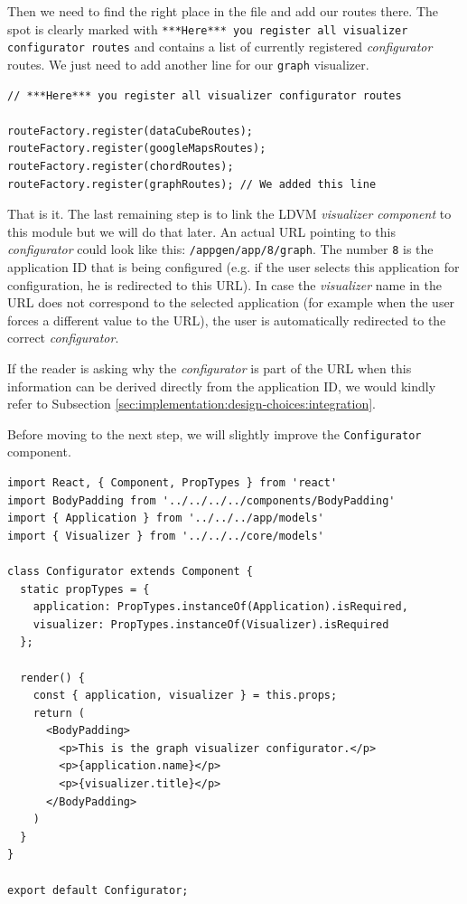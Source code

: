 Then we need to find the right place in the file and add our routes there. The spot is clearly marked with \texttt{***Here*** you register all visualizer configurator routes} and contains a list of currently registered \emph{configurator} routes. We just need to add another line for our \texttt{graph} visualizer.

\begin{verbatim}
// ***Here*** you register all visualizer configurator routes

routeFactory.register(dataCubeRoutes);
routeFactory.register(googleMapsRoutes);
routeFactory.register(chordRoutes);
routeFactory.register(graphRoutes); // We added this line
\end{verbatim}

That is it. The last remaining step is to link the LDVM \emph{visualizer component} to this module but we will do that later. An actual URL pointing to this \emph{configurator}  could look like this: \texttt{/appgen/app/8/graph}. The number \texttt{8} is the application ID that is being configured (e.g. if the user selects this application for configuration, he is redirected to this URL). In case the \emph{visualizer} name in the URL does not correspond to the selected application (for example when the user forces a different value to the URL), the user is automatically redirected to the correct \emph{configurator}.

If the reader is asking why the \emph{configurator} is part of the URL when this information can be derived directly from the application ID, we would kindly refer to Subsection \ref{sec:implementation:design-choices:integration}.

Before moving to the next step, we will slightly improve the \texttt{Configurator} component.

\begin{verbatim}
import React, { Component, PropTypes } from 'react'
import BodyPadding from '../../../../components/BodyPadding'
import { Application } from '../../../app/models'
import { Visualizer } from '../../../core/models'

class Configurator extends Component {
  static propTypes = {
    application: PropTypes.instanceOf(Application).isRequired,
    visualizer: PropTypes.instanceOf(Visualizer).isRequired
  };

  render() {
    const { application, visualizer } = this.props;
    return (
      <BodyPadding>
        <p>This is the graph visualizer configurator.</p>
        <p>{application.name}</p>
        <p>{visualizer.title}</p>
      </BodyPadding>
    )
  }
}

export default Configurator;
\end{verbatim}

